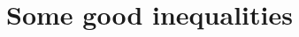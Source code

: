 \documentclass[biber]{nowfnt} %
\begin{document}
%

\appendix

\chapter{Some good inequalities}
  \label{app:inequalities}

\end{document}
